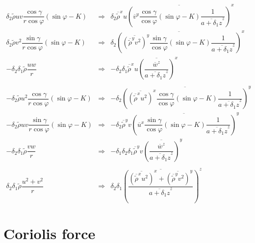 \begin{eqnarray}
 \delta _{2}\tilde{\rho}  u   v
 \dfrac{ \cos\gamma}{r \cos\varphi} (\sin\varphi -K) & \Longrightarrow &
 \delta _{2} \overline{\tilde{\rho}}^{x}   u
 \overline{\left(\overline{ v }^{y}
 \dfrac{ \cos\gamma}{ \cos\varphi} (\sin\varphi -K)
 \dfrac{1}{\overline{a+\delta _{1} z}^{z}}\right)}^{x}  \\
\delta _{2}\tilde{\rho}  v ^{2}  \dfrac{ \sin\gamma  }{r \cos \varphi} (\sin\varphi -K)
& \Longrightarrow & \delta _{2}  \overline{\left( \overline{\left(\overline{\tilde{\rho}}^{y}
 v ^{2}\right)}^{y}\dfrac{ \sin\gamma}{ \cos\varphi} (\sin\varphi -K)
 \dfrac{1}{\overline{a+\delta _{1} z}^{z}}\right)}^{x}
 \\
 - \delta _{2}\delta _{1} \tilde{\rho}\dfrac{ u  w}{r}
  & \Longrightarrow &
 - \delta _{2}\delta _{1} \overline{\tilde{\rho}}^{x}  u
 \overline{\left( \dfrac{\overline{ w}^{z}}{\overline{a+\delta _{1} z}^{z}} \right)}^{x}\\
 \nonumber \\
 -  \delta _{2}\tilde{\rho}  u ^{2}  \dfrac{ \cos\gamma}{r \cos\varphi} (\sin\varphi -K)
& \Longrightarrow &  -  \delta _{2}
 \overline{\left(\overline{\left(
\overline{\tilde{\rho}}^{x}
  u ^{2}\right)}^{x}  \dfrac{ \cos\gamma}{ \cos\varphi} (\sin\varphi -K)
 \dfrac{1}{\overline{a+\delta _{1} z}^{z}}\right)}^{y}\\
 - \delta _{2}\tilde{\rho}  u   v
   \dfrac{\sin\gamma}{r \cos \varphi} (\sin\varphi -K)
& \Longrightarrow & -  \delta _{2} \overline{\tilde{\rho}}^{y} v
 \overline{\left( \overline{  u }^{x} \dfrac{ \sin\gamma}{ \cos\varphi} (\sin\varphi -K)
 \dfrac{1}{\overline{a+\delta _{1} z}^{z}}\right)}^{y} \\
-  \delta _{2}\delta _{1} \tilde{\rho}\dfrac{ v  w}{r}
& \Longrightarrow & -  \delta_1\delta _{2}\delta _{1}\overline{\tilde{\rho}}^{y}
 v \overline{\left( \dfrac{\overline{ w}^{z}}{
\overline{a+\delta _{1} z}^{z}} \right)}^{y}\\
 \nonumber \\
 \delta _{2}\delta _{1}\tilde{\rho}\dfrac{ u ^{2}+ v ^{2} }{r}
& \Longrightarrow &    \delta _{2}\delta _{1}
\overline{\left(\dfrac{ \overline{\left(\overline{\tilde{\rho}}^{x} u ^{2}\right)}^{x}
+ \overline{\left( \overline{\tilde{\rho}}^{y} v ^{2}\right)}^{y}}
{\overline{a+\delta _{1} z}^{z}}\right)}^{z}
\end{eqnarray}

\section{Coriolis force}

